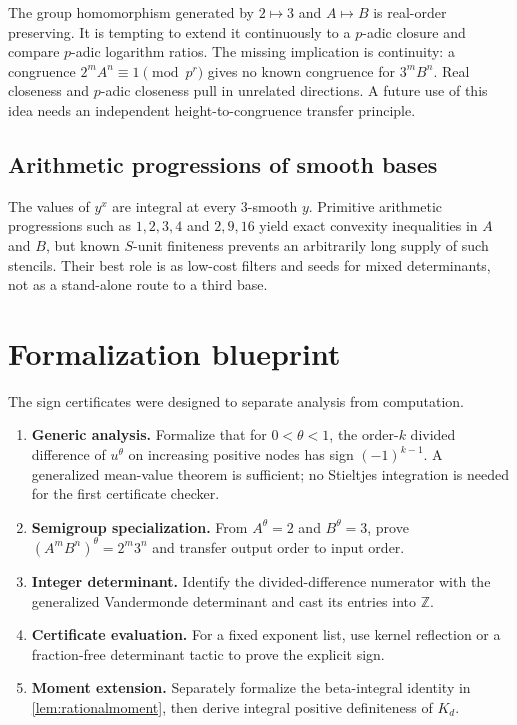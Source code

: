 \documentclass[11pt]{article}
\theoremstyle{definition}
\theoremstyle{remark}
\newcommand{\Z}{\mathbb Z}
\begin{document}
The group homomorphism generated by $2\mapsto3$ and $A\mapsto B$ is real-order preserving.
It is tempting to extend it continuously to a $p$-adic closure and compare $p$-adic logarithm
ratios.  The missing implication is continuity: a congruence
$2^mA^n\equiv1\pmod{p^r}$ gives no known congruence for $3^mB^n$.  Real closeness and
$p$-adic closeness pull in unrelated directions.  A future use of this idea needs an
independent height-to-congruence transfer principle.

\subsection{Arithmetic progressions of smooth bases}

The values of $y^x$ are integral at every $3$-smooth $y$.  Primitive arithmetic progressions
such as $1,2,3,4$ and $2,9,16$ yield exact convexity inequalities in $A$ and $B$, but known
$S$-unit finiteness prevents an arbitrarily long supply of such stencils.  Their best role is
as low-cost filters and seeds for mixed determinants, not as a stand-alone route to a third
base.

\section{Formalization blueprint}

The sign certificates were designed to separate analysis from computation.

\begin{enumerate}[label=\textbf{Layer \arabic*.},wide]
\item \textbf{Generic analysis.}  Formalize that for $0<\theta<1$, the order-$k$ divided
      difference of $u^\theta$ on increasing positive nodes has sign $(-1)^{k-1}$.
      A generalized mean-value theorem is sufficient; no Stieltjes integration is needed for
      the first certificate checker.
\item \textbf{Semigroup specialization.}  From $A^\theta=2$ and $B^\theta=3$, prove
      $(A^mB^n)^\theta=2^m3^n$ and transfer output order to input order.
\item \textbf{Integer determinant.}  Identify the divided-difference numerator with the
      generalized Vandermonde determinant and cast its entries into $\Z$.
\item \textbf{Certificate evaluation.}  For a fixed exponent list, use kernel reflection or
      a fraction-free determinant tactic to prove the explicit sign.
\item \textbf{Moment extension.}  Separately formalize the beta-integral identity in
      \cref{lem:rationalmoment}, then derive integral positive definiteness of $K_d$.
\end{enumerate}
\end{document}
